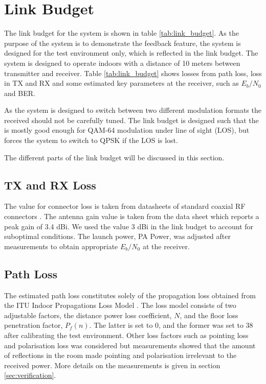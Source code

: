 \section{Link Budget}
\label{sec:link_budget}
The link budget for the system is shown in table \ref{tab:link_budget}. As the purpose of the system is to demonstrate the feedback feature, the system is designed for the test environment only, which is reflected in the link budget. The system is designed to operate indoors with a distance of 10 meters between transmitter and receiver. Table \ref{tab:link_budget} shows losses from path loss, loss in TX and RX and some estimated key parameters at the receiver, such as $E_b/N_0$ and BER. 

As the system is designed to switch between two different modulation formats the received \ebnot should not be carefully tuned. The link budget is designed such that the \ebnot is mostly good enough for QAM-64 modulation under line of sight (LOS), but forces the system to switch to QPSK if the LOS is lost. 

The different parts of the link budget will be discussed in this section.

\subsection{TX and RX Loss}
\label{sec:txandrxloss}
The value for connector loss is taken from datasheets of standard coaxial RF connectors \cite{rfconnector}. The antenna gain value is taken from the data sheet \cite{antenna} which reports a peak gain of 3.4 dBi. We used the value 3 dBi in the link budget to account for suboptimal conditions. The launch power, PA Power, was adjusted after measurements to obtain appropriate $E_b/N_0$ at the receiver.

\subsection{Path Loss}
\label{sec:path_loss}
The estimated path loss constitutes solely of the propagation loss obtained from the ITU Indoor Propagations Loss Model \cite{itu_model}. The loss model consists of two adjustable factors, the distance power loss coefficient, $N$, and the floor loss penetration factor, $P_f(n)$. The latter is set to 0, and the former was set to 38 after calibrating the test environment. Other loss factors such as pointing loss and polarisation loss was considered but measurements showed that the amount of reflections in the room made pointing and polarisation irrelevant to the received power. More details on the measurements is given in section \ref{sec:verification}. 

